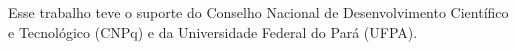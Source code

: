 

\begin{agradecimentos}

Esse trabalho teve o suporte do Conselho Nacional de Desenvolvimento Científico e Tecnológico (CNPq) e da Universidade Federal do Pará (UFPA).


%
%


\end{agradecimentos}